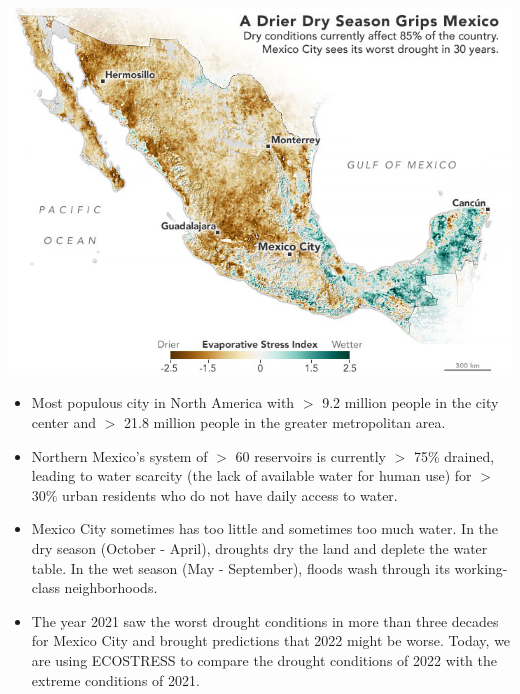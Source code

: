 \documentclass[oneside,a4paper,11pt,explicit]{book}
\begin{document}



\begin{tcolorbox}[colback=yellow!5!white,colframe=IceCreamLeaf,title=\textbf{Mexico City}]
	\begin{multicols}{2}

	\centerline{\includegraphics[width=\columnwidth]{mexico_esi_2021.png}}

	\columnbreak
		\begin{itemize}
			\item Most populous city in North America with $>$ 9.2 million people in the city center and $>$ 21.8 million people in the greater metropolitan area. 
			\item Northern Mexico's system of $>$ 60 reservoirs is currently $>$ 75\% drained, leading to water scarcity (the lack of available water for human use) for $>$ 30\% urban residents who do not have daily access to water.
		\end{itemize}
	\end{multicols}

	\begin{itemize}
		\item Mexico City sometimes has too little and sometimes too much water. In the dry season (October - April), droughts dry the land and deplete the water table. In the wet season (May - September), floods wash through its working-class neighborhoods.
		\item The year 2021 saw the worst drought conditions in more than three decades for Mexico City and brought predictions that 2022 might be worse. Today, we are using ECOSTRESS to compare the drought conditions of 2022 with the extreme conditions of 2021.
	\end{itemize}

\end{tcolorbox}
\end{document}

